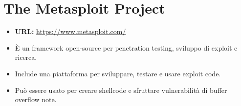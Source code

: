 \documentclass{article}
\begin{document}
\newpage
\section{The Metasploit Project}
\begin{itemize}
    \item \textbf{URL:} \url{https://www.metasploit.com/}
    \item È un framework open-source per penetration testing, sviluppo di exploit e ricerca.
    \item Include una piattaforma per sviluppare, testare e usare exploit code.
    \item Può essere usato per creare shellcode e sfruttare vulnerabilità di buffer overflow note.
\end{itemize}
\end{document}
